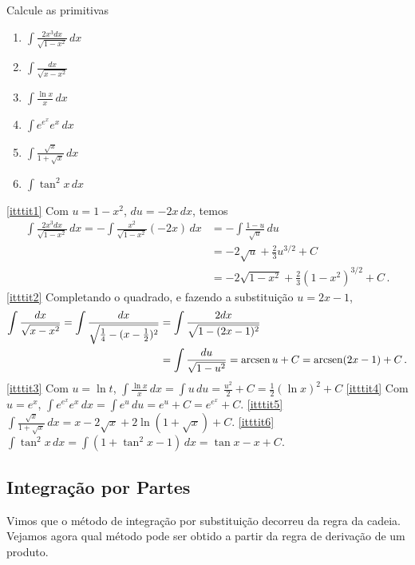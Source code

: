 \begin{exo}
Calcule as primitivas
\begin{multicols}{3}
\begin{enumerate}
\item\label{itttit1} $\int \frac{2x^3dx}{\sqrt{1-x^2}}\,dx$
\item\label{itttit2} $\int \frac{dx}{\sqrt{x-x^2}}$
\item\label{itttit3} $\int \frac{\ln x}{x}\,dx$
\item\label{itttit4} $\int e^{e^x}e^x\,dx$
\item\label{itttit5} $\int \frac{\sqrt{x}}{1+\sqrt{x}}\,dx$
\item\label{itttit6} $\int \tan^2x\,dx$
\end{enumerate}
\end{multicols}
\vspace{0.01cm}

\begin{sol}
\eqref{itttit1}
Com $u=1-x^2$, $du=-2x\,dx$, temos
\begin{align*}
\int \frac{2x^3dx}{\sqrt{1-x^2}}\,dx=-\int
\frac{x^2}{\sqrt{1-x^2}}(-2x)\,dx
&=-\int \frac{1-u}{\sqrt{u}}\,du\\
&=-2\sqrt{u}+\tfrac23 u^{3/2}+C\\
&=-2\sqrt{1-x^2}+\tfrac23 (1-x^2)^{3/2}+C\,.
\end{align*}
\eqref{itttit2}
Completando o quadrado, e fazendo a substituição $u=2x-1$,
\begin{align*}
\int \frac{dx}{\sqrt{x-x^2}}=\int 
\frac{dx}{\sqrt{\tfrac14-(x-\tfrac12)^2}}&=
\int \frac{2 dx}{\sqrt{1-(2x-1)^2}}\\
&=\int \frac{du}{\sqrt{1-u^2}}=\operatorname{arcsen} u+C=\operatorname{arcsen} (2x-1)+C\,.
\end{align*}
\eqref{itttit3} Com $u=\ln t$, $\int \frac{\ln x}{x}\,dx=\int
u\,du=\tfrac{u^2}{2}+C=\tfrac12(\ln x)^2+C$
\eqref{itttit4} Com $u=e^x$, $\int e^{e^x}e^x\,dx=\int e^u\,du=e^u+C=e^{e^x}+C$.
\eqref{itttit5} $\int \frac{\sqrt{x}}{1+\sqrt{x}}\,dx=x-2\sqrt{x}+2\ln
(1+\sqrt{x})+C$.
\eqref{itttit6} $\int \tan^2x\,dx=\int(1+\tan^2x-1)\,dx=\tan x-x+C$.
\end{sol}
\end{exo}

\subsection{Integração por Partes}\label{Sec:MetodoPartes}
Vimos que o método de integração por substituição decorreu da regra da cadeia.
Vejamos agora qual método pode ser obtido a partir da regra de derivação de um
produto.

